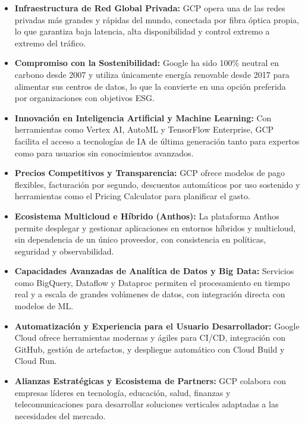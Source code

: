 {                \begin{itemize}
                    \item \textbf{Infraestructura de Red Global Privada:} GCP opera una de las redes privadas más grandes y rápidas del mundo, conectada por fibra óptica propia, lo que garantiza baja latencia, alta disponibilidad y control extremo a extremo del tráfico.
                    \item \textbf{Compromiso con la Sostenibilidad:} Google ha sido 100\% neutral en carbono desde 2007 y utiliza únicamente energía renovable desde 2017 para alimentar sus centros de datos, lo que la convierte en una opción preferida por organizaciones con objetivos ESG.
                    \item \textbf{Innovación en Inteligencia Artificial y Machine Learning:} Con herramientas como Vertex AI, AutoML y TensorFlow Enterprise, GCP facilita el acceso a tecnologías de IA de última generación tanto para expertos como para usuarios sin conocimientos avanzados.
                    \item \textbf{Precios Competitivos y Transparencia:} GCP ofrece modelos de pago flexibles, facturación por segundo, descuentos automáticos por uso sostenido y herramientas como el Pricing Calculator para planificar el gasto.
                    \item \textbf{Ecosistema Multicloud e Híbrido (Anthos):} La plataforma Anthos permite desplegar y gestionar aplicaciones en entornos híbridos y multicloud, sin dependencia de un único proveedor, con consistencia en políticas, seguridad y observabilidad.
                    \item \textbf{Capacidades Avanzadas de Analítica de Datos y Big Data:} Servicios como BigQuery, Dataflow y Dataproc permiten el procesamiento en tiempo real y a escala de grandes volúmenes de datos, con integración directa con modelos de ML.
                    \item \textbf{Automatización y Experiencia para el Usuario Desarrollador:} Google Cloud ofrece herramientas modernas y ágiles para CI/CD, integración con GitHub, gestión de artefactos, y despliegue automático con Cloud Build y Cloud Run.
                    \item \textbf{Alianzas Estratégicas y Ecosistema de Partners:} GCP colabora con empresas líderes en tecnología, educación, salud, finanzas y telecomunicaciones para desarrollar soluciones verticales adaptadas a las necesidades del mercado.
                \end{itemize}
                
}
